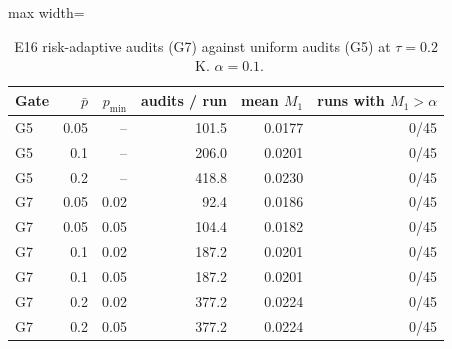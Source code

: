 \begin{table}[t]\centering\small
\begin{adjustbox}{max width=\linewidth}\begin{tabular}{lrrrrr}
\hline
Gate & $\bar p$ & $p_{\min}$ & audits / run & mean $M_1$ & runs with $M_1>\alpha$ \\
\hline
G5 & 0.05 & -- & 101.5 & 0.0177 & 0/45 \\
G5 & 0.1 & -- & 206.0 & 0.0201 & 0/45 \\
G5 & 0.2 & -- & 418.8 & 0.0230 & 0/45 \\
G7 & 0.05 & 0.02 & 92.4 & 0.0186 & 0/45 \\
G7 & 0.05 & 0.05 & 104.4 & 0.0182 & 0/45 \\
G7 & 0.1 & 0.02 & 187.2 & 0.0201 & 0/45 \\
G7 & 0.1 & 0.05 & 187.2 & 0.0201 & 0/45 \\
G7 & 0.2 & 0.02 & 377.2 & 0.0224 & 0/45 \\
G7 & 0.2 & 0.05 & 377.2 & 0.0224 & 0/45 \\
\hline
\end{tabular}\end{adjustbox}
\caption{E16 risk-adaptive audits (G7) against uniform audits (G5) at $\tau = 0.2$~K. $\alpha = 0.1$.}
\label{tab:e16-tau02}
\end{table}
